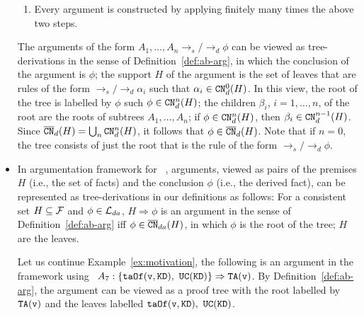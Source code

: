 \begin{itemize}
\begin{enumerate}
    \item Every argument is constructed by applying finitely many times the above two steps.
\end{enumerate}


The arguments of the form $A_1, \ldots, A_n \rightarrow_s / \rightarrow_d \phi$ can be viewed as tree-derivations in the sense of Definition~\ref{def:ab-arg}, in which the conclusion of the argument is $\phi$; 
the support $H$ of the argument is the set of leaves that are rules of the form $\rightarrow_s / \rightarrow_d \alpha_i$ such that $\alpha_i \in \texttt{\textup{CN}}^{0}_{d}(H)$. In this view, the root of the tree is labelled by $\phi$ such $\phi \in \texttt{\textup{CN}}^{n}_{d}(H)$; the children $\beta_i$, $i = 1, \ldots, n$, of the root are the roots of subtrees $A_1, \ldots, A_n$; if $\phi \in \texttt{\textup{CN}}^{n}_{d}(H)$, then $\beta_i \in \texttt{\textup{CN}}^{n-1}_{d}(H)$.
Since $\overline{\texttt{\textup{CN}}}_{d}(H) = \bigcup_{n}\texttt{\textup{CN}}^{n}_{d}(H) $, it follows that $\phi \in \overline{\texttt{\textup{CN}}}_{d}(H)$.
Note that if $n = 0$, the tree consists of just the root that is the rule of the form $\rightarrow_s / \rightarrow_d \phi$.





\item In argumentation framework for \datalogPM~\cite{ARIOUA201776,Amgoud12}, arguments, viewed as pairs of the premises $H$ (i.e., the set of facts) and the conclusion $\phi$ (i.e., the derived fact), can be represented as tree-derivations in our definitions as follows:  For a consistent set $H \subseteq \mathcal{F}$ and $\phi \in \mathcal{L}_{da}$, $H \Rightarrow \phi$ is an argument in the sense of Definition~\ref{def:ab-arg} iff $\phi \in \overline{\texttt{\textup{CN}}}_{da}(H)$, in which $\phi$ is the root of the tree; $H$ are the leaves.

\begin{example}
    Let us continue Example~\ref{ex:motivation}, the following is an argument in the framework using \datalogPM~$A_7 : \{ \texttt{\textup{taOf}}(\texttt{\textup{v}}, \texttt{\textup{KD}}),\ \texttt{\textup{UC}}(\texttt{\textup{KD}}) \} \Rightarrow \texttt{\textup{TA}}(\texttt{\textup{v}})$. By Definition~\ref{def:ab-arg}, the argument can be viewed as a proof tree with the root labelled by $\texttt{\textup{TA}}(\texttt{\textup{v}})$ and the leaves labelled $\texttt{\textup{taOf}}(\texttt{\textup{v}}, \texttt{\textup{KD}}),\ \texttt{\textup{UC}}(\texttt{\textup{KD}})$.
\end{example}
\end{itemize}

